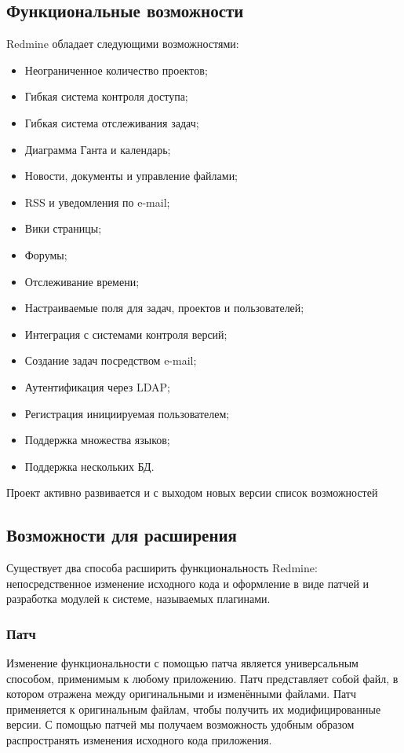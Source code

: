\subsection{Функциональные возможности}
Redmine обладает следующими возможностями:
\begin{itemize}
  \item Неограниченное количество проектов;
  \item Гибкая система контроля доступа;
  \item Гибкая система отслеживания задач;
  \item Диаграмма Ганта и календарь;
  \item Новости, документы и управление файлами;
  \item RSS и уведомления по e-mail;
  \item Вики страницы;
  \item Форумы;
  \item Отслеживание времени;
  \item Настраиваемые поля для задач, проектов и пользователей;
  \item Интеграция с системами контроля версий;
  \item Создание задач посредством e-mail;
  \item Аутентификация через LDAP;
  \item Регистрация инициируемая пользователем;
  \item Поддержка множества языков;
  \item Поддержка нескольких БД.
\end{itemize}
Проект активно развивается и с выходом новых версии список возможностей

\subsection{Возможности для расширения}
Существует два способа расширить функциональность Redmine: непосредственное
изменение исходного кода и оформление  в виде патчей и разработка
 модулей к системе, называемых плагинами.

\subsubsection{Патч}
Изменение функциональности с помощью патча является универсальным способом,
применимым к любому  приложению. Патч представляет собой файл, в
котором отражена  между оригинальными и изменёнными файлами. Патч
применяется к оригинальным файлам, чтобы получить их модифицированные версии. С
помощью патчей мы получаем возможность удобным образом распространять изменения
исходного кода приложения. 

